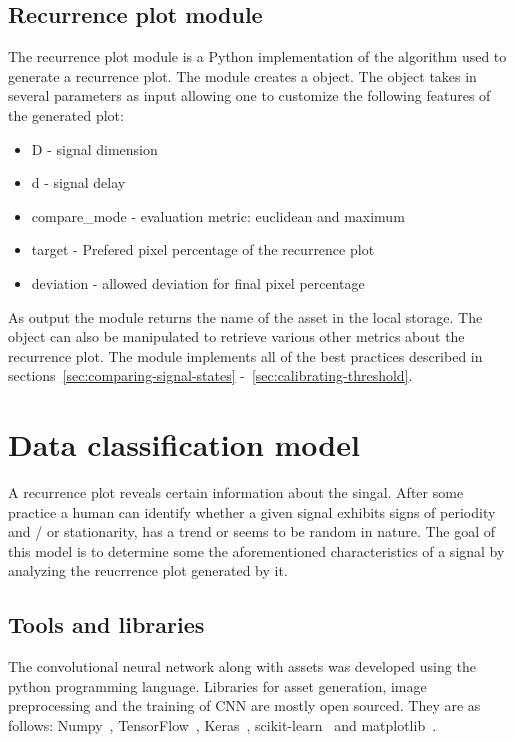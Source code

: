 \documentclass[a4paper,12pt,fleqn]{article}
\begin{document}
\subsection{Recurrence plot module}
\label{sec:recurrence_plot_module}
The recurrence plot module is a Python implementation of the algorithm used to generate a recurrence plot.
The module creates a  object.
The object takes in several parameters as input allowing one to customize the following features of the generated plot:
\begin{itemize}
  \item D - signal dimension
  \item d - signal delay
  \item compare\_mode - evaluation metric: euclidean and maximum
  \item target - Prefered pixel percentage of the recurrence plot
  \item deviation - allowed deviation for final pixel percentage
\end{itemize}
As output the module returns the name of the asset in the local storage.
The object can also be manipulated to retrieve various other metrics about the recurrence plot.
The module implements all of the best practices described in sections~\ref{sec:comparing-signal-states} -~\ref{sec:calibrating-threshold}.


\section{Data classification model}
A recurrence plot reveals certain information about the singal.
After some practice a human can identify whether a given signal exhibits signs of periodity and / or stationarity, has a trend or seems to be random in nature.
The goal of this model is to determine some the aforementioned characteristics of a signal by analyzing the reucrrence plot generated by it.


\subsection{Tools and libraries}
The convolutional neural network along with assets was developed using the python programming language. Libraries for asset generation, image preprocessing and the training of CNN are mostly open sourced. They are as follows: Numpy~\cite{numpy}, TensorFlow~\cite{tensorflow}, Keras~\cite{keras}, scikit-learn~\cite{scikit-learn} and matplotlib~\cite{matplotlib}.
\end{document}
